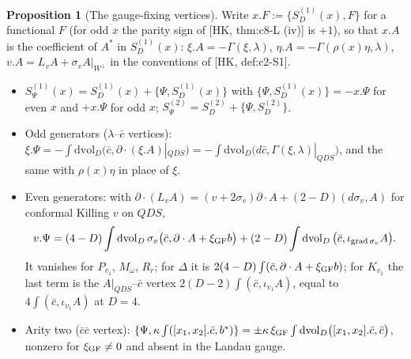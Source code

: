 \documentclass[11pt]{article}
\theoremstyle{definition}
\newtheorem{proposition}[definition]{Proposition}
\numberwithin{equation}{section}
\begin{document}
\begin{proposition}[The gauge-fixing vertices]
\label{prop:gfvert}
Write $x.F:=\{S^{(1)}_D(x),F\}$ for a functional $F$ (for odd $x$ the parity sign of [HK, thm:c8-L (iv)] is $+1$), so that $x.A$ is the coefficient of $A^*$ in $S^{(1)}_D(x)$: $\xi.A=-\Gamma(\xi,\lambda)$, $\eta.A=-\Gamma(\rho(x)\eta,\lambda)$, $v.A=L_vA+\sigma_vA|_{W^\perp}$ in the conventions of [HK, def:c2-S1].
\begin{itemize}
\item[(i)] $S^{(1)}_{\Psi}(x)=S^{(1)}_D(x)+\{\Psi,S^{(1)}_D(x)\}$ with $\{\Psi,S^{(1)}_D(x)\}=-x.\Psi$ for even $x$ and $+x.\Psi$ for odd $x$; $S^{(2)}_\Psi=S^{(2)}_D+\{\Psi,S^{(2)}_D\}$.
\item[(ii)] Odd generators ($\lambda$--$\bar c$ vertices): $\xi.\Psi=-\int\mathrm{dvol}_D\big(\bar c,\partial\cdot(\xi.A)|_{QDS}\big)=-\int\mathrm{dvol}_D\big(d\bar c,\Gamma(\xi,\lambda)|_{QDS}\big)$, and the same with $\rho(x)\eta$ in place of $\xi$.
\item[(iii)] Even generators: with $\partial\cdot(L_vA)=(v+2\sigma_v)\partial\cdot A+(2-D)(d\sigma_v,A)$ for conformal Killing $v$ on $QDS$,
\[
v.\Psi=(4-D)\int\mathrm{dvol}_D\,\sigma_v\big(\bar c,\partial\cdot A+\xi_{\rm GF}b\big)+(2-D)\int\mathrm{dvol}_D\,\big(\bar c,\iota_{\mathrm{grad}\,\sigma_v}A\big).
\]
It vanishes for $P_{v_1}$, $M_\omega$, $R_r$; for $\Delta$ it is $2(4-D)\int(\bar c,\partial\cdot A+\xi_{\rm GF}b)$; for $K_{v_1}$ the last term is the $A|_{QDS}$--$\bar c$ vertex $2(D-2)\int(\bar c,\iota_{v_1}A)$, equal to $4\int(\bar c,\iota_{v_1}A)$ at $D=4$.
\item[(iv)] Arity two ($\bar c\bar c$ vertex): $\{\Psi,\kappa\int([x_1,x_2].\bar c,b^*)\}=\pm\kappa\,\xi_{\rm GF}\int\mathrm{dvol}_D\big([x_1,x_2].\bar c,\bar c\big)$, nonzero for $\xi_{\rm GF}\neq0$ and absent in the Landau gauge.
\end{itemize}
\end{proposition}
\end{document}
